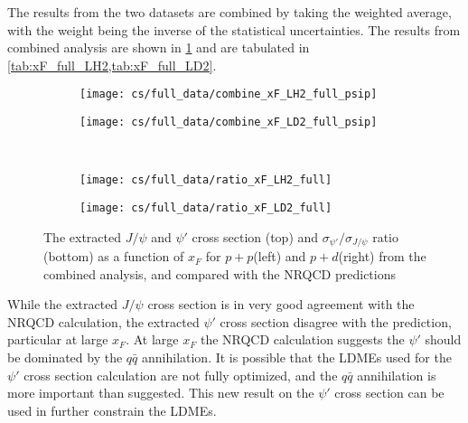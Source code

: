 \documentclass[../main.tex]{subfiles}
\begin{document}
The results from the two datasets are combined by taking the weighted average, with the weight being
the inverse of the statistical uncertainties.
The results from combined analysis are shown in \cref{fig:cs_xF_full} and are tabulated in
\cref{tab:xF_full_LH2,tab:xF_full_LD2}.
\begin{table}[h!]
	\centering
	\caption{Cross section as a function of $x_F$ (in \unit{\nano\barn\per nucleon}) and the
		$\sigma_{\psi'}/\sigma_{J/\psi}$ ratio for $p+p$ extracted from the combined analysis, with
		their statistical and systematic uncertainties and the average $x_F$ in each bin.}
	
	\label{tab:xF_full_LH2}
\end{table}
\begin{table}[h!]
	\centering
	\caption{Cross section as a function of $x_F$ (in \unit{\nano\barn\per nucleon}) and the
		$\sigma_{\psi'}/\sigma_{J/\psi}$ ratio for $p+d$ extracted from the combined analysis, with
		their statistical and systematic uncertainties and the average $x_F$ in each bin.}
	
	\label{tab:xF_full_LD2}
\end{table}
\begin{figure}
	\centering
	\begin{subfigure}{0.45\linewidth}
		\texttt{[image: cs/full\_data/combine\_xF\_LH2\_full\_psip]}
	\end{subfigure}
	\begin{subfigure}{0.45\linewidth}
		\texttt{[image: cs/full\_data/combine\_xF\_LD2\_full\_psip]}
	\end{subfigure}\\
	\begin{subfigure}{0.45\linewidth}
		\texttt{[image: cs/full\_data/ratio\_xF\_LH2\_full]}
	\end{subfigure}
	\begin{subfigure}{0.45\linewidth}
		\texttt{[image: cs/full\_data/ratio\_xF\_LD2\_full]}
	\end{subfigure}
	\caption{The extracted $J/\psi$ and $\psi'$ cross section (top) and $\sigma_{\psi'}/\sigma_{J/\psi}$
		ratio (bottom) as a function of $x_F$ for $p+p$(left) and $p+d$(right) from
		the combined analysis, and compared with the NRQCD predictions}
	\label{fig:cs_xF_full}
\end{figure}

While the extracted $J/\psi$ cross section is in very good agreement with the NRQCD calculation,
the extracted $\psi'$
cross section disagree with the prediction, particular at large $x_F$. At large $x_F$ the NRQCD
calculation suggests the $\psi'$ should be dominated by the $q\bar{q}$ annihilation.
It is possible that the LDMEs used  for the $\psi'$ cross section calculation are not fully optimized,
and the $q\bar{q}$ annihilation is more important than suggested. This new result on the $\psi'$
cross section can be used in further constrain the LDMEs.
\end{document}
